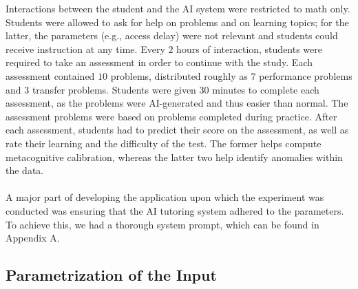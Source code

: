 \documentclass[12pt]{article}
\begin{document}
Interactions between the student and the AI system were restricted to math only. Students were allowed to ask for help on problems and on learning topics; for the latter, the parameters (e.g., access delay) were not relevant and students could receive instruction at any time. Every $2$ hours of interaction, students were required to take an assessment in order to continue with the study. Each assessment contained $10$ problems, distributed roughly as $7$ performance problems and $3$ transfer problems. Students were given $30$ minutes to complete each assessment, as the problems were AI-generated and thus easier than normal. The assessment problems were based on problems completed during practice. After each assessment, students had to predict their score on the assessment, as well as rate their learning and the difficulty of the test. The former helps compute metacognitive calibration, whereas the latter two help identify anomalies within the data.
\\\\
A major part of developing the application upon which the experiment was conducted was ensuring that the AI tutoring system adhered to the parameters. To achieve this, we had a thorough system prompt, which can be found in Appendix A. 


\subsection{Parametrization of the Input}
\end{document}
